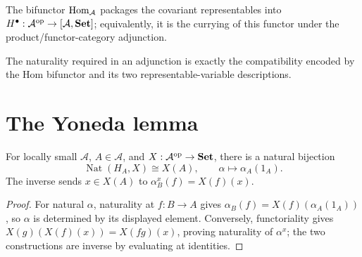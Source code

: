 \begin{remark}
\label{rem:lbc-hom-bifunctor}
The bifunctor $\operatorname{Hom}_{\mathcal A}$ packages the covariant representables into
$H^{\bullet}:\mathcal A^{\mathrm{op}}\to[\mathcal A,\mathbf{Set}]$; equivalently, it is the
currying of this functor under the product/functor-category adjunction.
\end{remark}

\begin{remark}
\label{rem:lbc-representable-naturality}
The naturality required in an adjunction is exactly the compatibility encoded by
the Hom bifunctor and its two representable-variable descriptions.
\end{remark}

\section{The Yoneda lemma}
\begin{theorem}
\label{thm:lbc-yoneda}
For locally small $\mathcal A$, $A\in\mathcal A$, and
$X:\mathcal A^{\mathrm{op}}\to\mathbf{Set}$, there is a natural bijection
\[\operatorname{Nat}(H_A,X)\cong X(A),\qquad \alpha\longmapsto\alpha_A(1_A).\]
The inverse sends $x\in X(A)$ to $\alpha^x_B(f)=X(f)(x)$.
\end{theorem}
\begin{proof}
For natural $\alpha$, naturality at $f:B\to A$ gives
$\alpha_B(f)=X(f)(\alpha_A(1_A))$, so $\alpha$ is determined by its displayed
element. Conversely, functoriality gives
$X(g)(X(f)(x))=X(fg)(x)$, proving naturality of $\alpha^x$; the two
constructions are inverse by evaluating at identities.
\end{proof}

